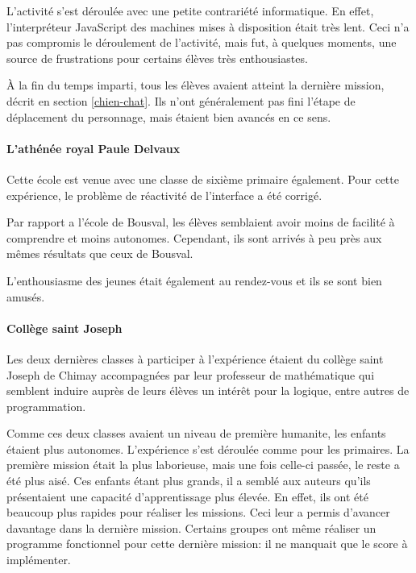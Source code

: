 L'activité s'est déroulée avec une petite contrariété informatique. En effet, l'interpréteur JavaScript des machines mises à disposition était très lent. Ceci n'a pas compromis le déroulement de l'activité, mais fut, à quelques moments, une source de frustrations pour certains élèves très enthousiastes.

À la fin du temps imparti, tous les élèves avaient atteint la dernière \gls{mission}, décrit en section \ref{chien-chat}. Ils n'ont généralement pas fini l'étape de déplacement du personnage, mais étaient bien avancés en ce sens.

\paragraph{L'athénée royal Paule Delvaux}
Cette école est venue avec une classe de sixième \gls{primaire} également. Pour cette expérience, le problème de réactivité de l'interface a été corrigé.

Par rapport a l'école de Bousval, les élèves semblaient avoir moins de facilité à comprendre et moins autonomes.
Cependant, ils sont arrivés à peu près aux mêmes résultats que ceux de Bousval.

L'enthousiasme des jeunes était également au rendez-vous et ils se sont bien amusés.

\paragraph{Collège saint Joseph}
Les deux dernières classes à participer à l'expérience étaient du collège saint Joseph de Chimay accompagnées par leur professeur de mathématique qui semblent induire auprès de leurs élèves un intérêt pour la logique, entre autres de programmation.

Comme ces deux classes avaient un niveau de première \gls{humanite}, les enfants étaient plus autonomes. L'expérience s'est déroulée comme pour les \glspl{primaire}. La première \gls{mission} était la plus laborieuse, mais une fois celle-ci passée, le reste a été plus aisé. Ces enfants étant plus grands, il a semblé aux auteurs qu'ils présentaient une capacité d'apprentissage plus élevée. En effet, ils ont été beaucoup plus rapides pour réaliser les \glspl{mission}. Ceci leur a permis d'avancer davantage dans la dernière \gls{mission}. Certains groupes ont même réaliser un programme fonctionnel pour cette dernière \gls{mission}: il ne manquait que le score à implémenter.\\

